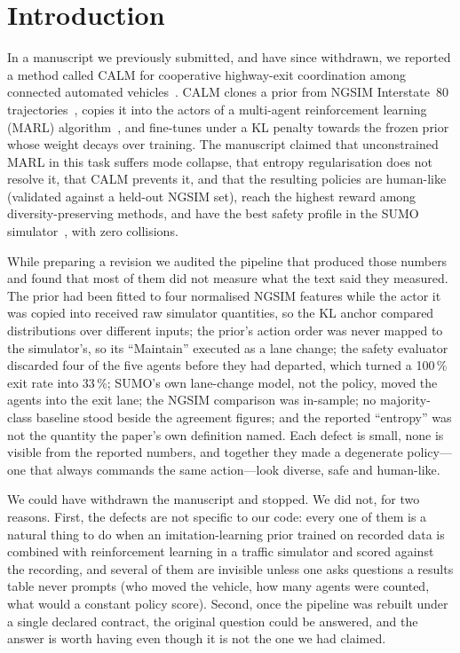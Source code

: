 \section{Introduction}
\label{sec:intro}

In a manuscript we previously submitted, and have since withdrawn, we reported a method called CALM for cooperative highway-exit coordination among connected automated vehicles~\cite{guanetti2018control,wang2021cooperative}. CALM clones a prior from NGSIM Interstate~80 trajectories~\cite{ngsim2006}, copies it into the actors of a multi-agent reinforcement learning (MARL) algorithm~\cite{lowe2017multi,rashid2018qmix}, and fine-tunes under a KL penalty towards the frozen prior whose weight decays over training. The manuscript claimed that unconstrained MARL in this task suffers mode collapse, that entropy regularisation does not resolve it, that CALM prevents it, and that the resulting policies are human-like (validated against a held-out NGSIM set), reach the highest reward among diversity-preserving methods, and have the best safety profile in the SUMO simulator~\cite{lopez2018microscopic}, with zero collisions.

While preparing a revision we audited the pipeline that produced those numbers and found that most of them did not measure what the text said they measured. The prior had been fitted to four normalised NGSIM features while the actor it was copied into received raw simulator quantities, so the KL anchor compared distributions over different inputs; the prior's action order was never mapped to the simulator's, so its ``Maintain'' executed as a lane change; the safety evaluator discarded four of the five agents before they had departed, which turned a 100\,\% exit rate into 33\,\%; SUMO's own lane-change model, not the policy, moved the agents into the exit lane; the NGSIM comparison was in-sample; no majority-class baseline stood beside the agreement figures; and the reported ``entropy'' was not the quantity the paper's own definition named. Each defect is small, none is visible from the reported numbers, and together they made a degenerate policy---one that always commands the same action---look diverse, safe and human-like.

We could have withdrawn the manuscript and stopped. We did not, for two reasons. First, the defects are not specific to our code: every one of them is a natural thing to do when an imitation-learning prior trained on recorded data is combined with reinforcement learning in a traffic simulator and scored against the recording, and several of them are invisible unless one asks questions a results table never prompts (who moved the vehicle, how many agents were counted, what would a constant policy score). Second, once the pipeline was rebuilt under a single declared contract, the original question could be answered, and the answer is worth having even though it is not the one we had claimed.

